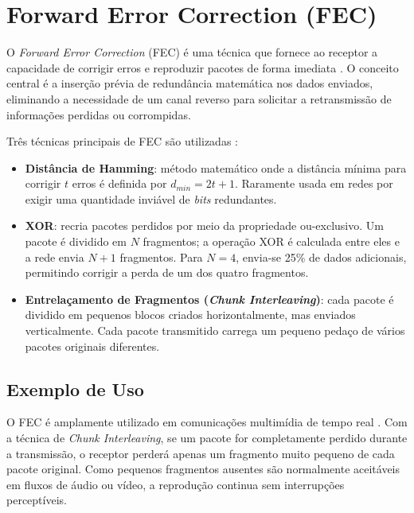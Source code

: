 \section{Forward Error Correction (FEC)}

O \textit{Forward Error Correction} (FEC) é uma técnica que fornece ao receptor
a capacidade de corrigir erros e reproduzir pacotes de forma imediata
\cite{geeksforgeeksfec2024}. O conceito central é a inserção prévia de redundância
matemática nos dados enviados, eliminando a necessidade de um canal reverso para
solicitar a retransmissão de informações perdidas ou corrompidas.

Três técnicas principais de FEC são utilizadas \cite{geeksforgeeksfec2024}:

\begin{itemize}
  \item \textbf{Distância de Hamming}: método matemático onde a distância mínima
  para corrigir $t$ erros é definida por $d_{min} = 2t+1$. Raramente usada em
  redes por exigir uma quantidade inviável de \textit{bits} redundantes.
  \item \textbf{XOR}: recria pacotes perdidos por meio da propriedade
  ou-exclusivo. Um pacote é dividido em $N$ fragmentos; a operação XOR é calculada
  entre eles e a rede envia $N+1$ fragmentos. Para $N=4$, envia-se 25\% de dados
  adicionais, permitindo corrigir a perda de um dos quatro fragmentos.
  \item \textbf{Entrelaçamento de Fragmentos (\textit{Chunk Interleaving})}: cada
  pacote é dividido em pequenos blocos criados horizontalmente, mas enviados
  verticalmente. Cada pacote transmitido carrega um pequeno pedaço de vários
  pacotes originais diferentes.
\end{itemize}

\subsection{Exemplo de Uso}

O FEC é amplamente utilizado em comunicações multimídia de tempo real
\cite{geeksforgeeksfec2024}. Com a técnica de \textit{Chunk Interleaving}, se um
pacote for completamente perdido durante a transmissão, o receptor perderá apenas
um fragmento muito pequeno de cada pacote original. Como pequenos fragmentos
ausentes são normalmente aceitáveis em fluxos de áudio ou vídeo, a reprodução
continua sem interrupções perceptíveis.

